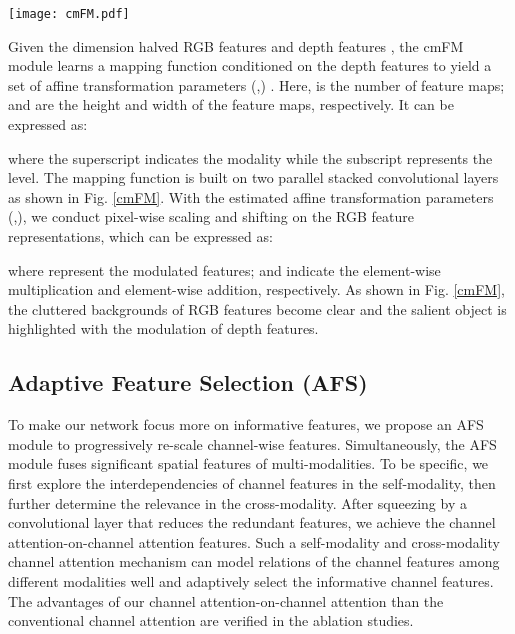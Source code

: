 \documentclass[runningheads]{llncs}
\begin{document}
\begin{figure*}[!ht]
	\centering
	\texttt{[image: cmFM.pdf]}
	\caption{\textbf{The proposed cmFM module}. For the estimation of both   and , the kernels of convolutional layers are 77, 55, 33, and 33. The feature extractor represents VGG-16 backbone. The feature maps are illustrated as heatmaps.}
	\label{cmFM}
\end{figure*}


Given the dimension halved RGB features  
 and depth features   ,  the cmFM module learns a mapping function  conditioned on the depth features to yield a set of affine transformation parameters (,) 
. Here,  is the number of feature maps;  and  are the height and width of the feature maps, respectively. It can be expressed as:

where the superscript indicates the modality while the subscript represents the level.  The mapping function  is built on two parallel stacked convolutional layers as shown in Fig. \ref{cmFM}.
With the estimated affine transformation parameters (,), we conduct pixel-wise scaling and shifting on the RGB feature representations, which can be expressed as:

where  represent the modulated features;  and  indicate the element-wise multiplication and element-wise addition, respectively. As shown in Fig. \ref{cmFM}, the cluttered backgrounds of RGB features become clear and the salient object is highlighted with the modulation of depth features.

\subsection{Adaptive Feature Selection (AFS)}

To make our network focus more on informative features, we propose an AFS module to progressively re-scale channel-wise features. Simultaneously, the AFS module fuses significant spatial features of multi-modalities. To be specific, we first explore the interdependencies of channel features in the self-modality, then further determine the relevance in the cross-modality. After squeezing by a convolutional layer that reduces the redundant features, we achieve the channel attention-on-channel attention features.  Such a self-modality and cross-modality channel attention mechanism can model relations of the channel features among different modalities well and adaptively select the informative channel features. The advantages of our channel attention-on-channel attention than the conventional channel attention are verified in the ablation studies.
\end{document}

